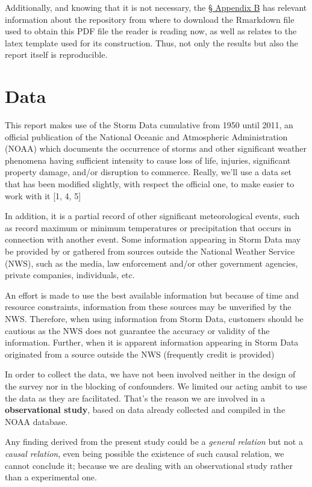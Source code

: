 \documentclass[12pt,spanish, american,b4paper, onecolumn, lmargin=1cm, rmargin=1cm, tmargin=1cm, bmargin=2cm,]{article}
\begin{document}
Additionally, and knowing that it is not necessary, the
\hyperref[appendix-b]{§ Appendix B} has relevant information about the
repository from where to download the Rmarkdown file used to obtain this
PDF file the reader is reading now, as well as relates to the latex
template used for its construction. Thus, not only the results but also
the report itself is reproducible.

\section{Data \label{data}}\label{data}

This report makes use of the Storm Data cumulative from 1950 until 2011,
an official publication of the National Oceanic and Atmospheric
Administration (NOAA) which documents the occurrence of storms and other
significant weather phenomena having sufficient intensity to cause loss
of life, injuries, significant property damage, and/or disruption to
commerce. Really, we'll use a data set that has been modified slightly,
with respect the official one, to make easier to work with it {[}1, 4,
5{]}

In addition, it is a partial record of other significant meteorological
events, such as record maximum or minimum temperatures or precipitation
that occurs in connection with another event. Some information appearing
in Storm Data may be provided by or gathered from sources outside the
National Weather Service (NWS), such as the media, law enforcement
and/or other government agencies, private companies, individuals, etc.

An effort is made to use the best available information but because of
time and resource constraints, information from these sources may be
unverified by the NWS. Therefore, when using information from Storm
Data, customers should be cautious as the NWS does not guarantee the
accuracy or validity of the information. Further, when it is apparent
information appearing in Storm Data originated from a source outside the
NWS (frequently credit is provided)

In order to collect the data, we have not been involved neither in the
design of the survey nor in the blocking of confounders. We limited our
acting ambit to use the data as they are facilitated. That's the reason
we are involved in a \textbf{observational study}, based on data already
collected and compiled in the NOAA database.

Any finding derived from the present study could be a \emph{general
relation} but not a \emph{causal relation}, even being possible the
existence of such causal relation, we cannot conclude it; because we are
dealing with an observational study rather than a experimental one.
\end{document}
